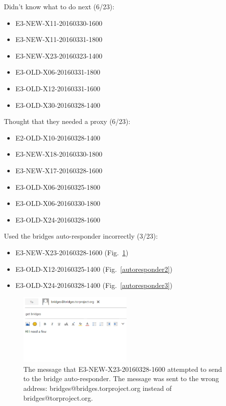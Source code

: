 \documentclass[USenglish,oneside,twocolumn]{article}
\begin{document}
Didn't know what to do next (6/23): 
\begin{itemize}
\item E3-NEW-X11-20160330-1600
\item E3-NEW-X11-20160331-1800
\item E3-NEW-X23-20160323-1400
\item E3-OLD-X06-20160331-1800
\item E3-OLD-X12-20160331-1600
\item E3-OLD-X30-20160328-1400
\end{itemize} 

Thought that they needed a proxy (6/23): 
\begin{itemize}
\item E2-OLD-X10-20160328-1400
\item E3-NEW-X18-20160330-1800
\item E3-NEW-X17-20160328-1600
\item E3-OLD-X06-20160325-1800
\item E3-OLD-X06-20160330-1800
\item E3-OLD-X24-20160328-1600
\end{itemize} 

Used the bridges auto-responder incorrectly (3/23): 
\begin{itemize}
\item E3-NEW-X23-20160328-1600 (Fig.~\ref{autoresponder1})
\item E3-OLD-X12-20160325-1400 (Fig.~\ref{autoresponder2})
\item E3-OLD-X24-20160328-1400 (Fig.~\ref{autoresponder3})
\end{itemize}   

\begin{figure}[h]
\includegraphics[width=0.5\textwidth]{../experiment/processing/failed-participants/20160325-140813-bridgeresponder-redacted.png}
\caption{The message that E3-NEW-X23-20160328-1600 attempted to send to the bridge auto-responder. The message was sent to the wrong address: bridges@bridges.torproject.org instead of bridges@torproject.org.}
\label{autoresponder1}
\end{figure} 
\end{document}
